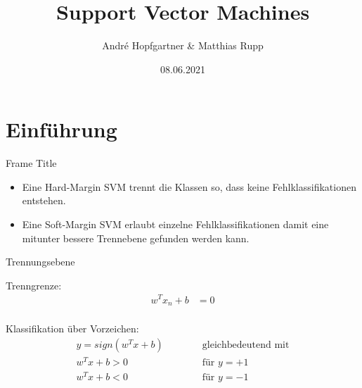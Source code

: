\documentclass[ngerman]{beamer}
\title{Support Vector Machines}
\author{André Hopfgartner \& Matthias Rupp}
\institute{Vorarlberg University of Applied Sciences}
\date{08.06.2021}
\begin{document}
\begin{frame}[plain]
    \maketitle
\end{frame}

\section{Einführung}


\begin{frame}{Frame Title}
\begin{itemize}
	\item Eine Hard-Margin SVM trennt die Klassen so, dass keine Fehlklassifikationen entstehen. 
	\pause 
	\item Eine Soft-Margin SVM erlaubt einzelne Fehlklassifikationen damit eine mitunter bessere Trennebene gefunden werden kann.
\end{itemize}
	
\end{frame}


\begin{frame}{Trennungsebene}
	
	Trenngrenze:
	\begin{equation} \label{plane_eq}
		\begin{aligned}
			w^{T} x_{n} + b &= 0 \\
		\end{aligned}
	\end{equation}
	\pause
	
	Klassifikation über Vorzeichen:
	\begin{subequations} \label{svm_classify1}
		\begin{alignat}{2}
			y = sign(w^{T} x + b)  & \qquad & \text{ gleichbedeutend mit} \\
			w^{T} x + b > 0 & & \text{ für } y = +1\\
			w^{T} x + b < 0 & & \text{ für } y = -1
		\end{alignat}
	\end{subequations}

\end{frame}
\end{document}
